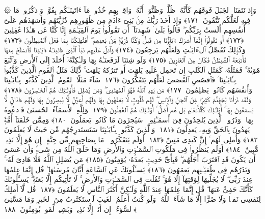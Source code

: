 ۞ وَإِذ نَتَقنَا ٱلجَبَلَ فَوقَهُم كَأَنَّهُۥ ظُلَّةٌۭ وَظَنُّوٓا۟ أَنَّهُۥ وَاقِعٌۢ بِهِم خُذُوا۟ مَآ ءَاتَينَـٰكُم بِقُوَّةٍۢ وَٱذكُرُوا۟ مَا فِيهِ لَعَلَّكُم تَتَّقُونَ ﴿١٧١﴾
 وَإِذ أَخَذَ رَبُّكَ مِنۢ بَنِىٓ ءَادَمَ مِن ظُهُورِهِم ذُرِّيَّتَهُم وَأَشهَدَهُم عَلَىٰٓ أَنفُسِهِم أَلَستُ بِرَبِّكُم ۖ قَالُوا۟ بَلَىٰ ۛ شَهِدنَآ ۛ أَن تَقُولُوا۟ يَومَ ٱلقِيَـٰمَةِ إِنَّا كُنَّا عَن هَـٰذَا غَٰفِلِينَ ﴿١٧٢﴾
 أَو تَقُولُوٓا۟ إِنَّمَآ أَشرَكَ ءَابَآؤُنَا مِن قَبلُ وَكُنَّا ذُرِّيَّةًۭ مِّنۢ بَعدِهِم ۖ أَفَتُهلِكُنَا بِمَا فَعَلَ ٱلمُبطِلُونَ ﴿١٧٣﴾
 وَكَذَٟلِكَ نُفَصِّلُ ٱلءَايَـٰتِ وَلَعَلَّهُم يَرجِعُونَ ﴿١٧٤﴾
 وَٱتلُ عَلَيهِم نَبَأَ ٱلَّذِىٓ ءَاتَينَـٰهُ ءَايَـٰتِنَا فَٱنسَلَخَ مِنهَا فَأَتبَعَهُ ٱلشَّيطَٰنُ فَكَانَ مِنَ ٱلغَاوِينَ ﴿١٧٥﴾
 وَلَو شِئنَا لَرَفَعنَـٰهُ بِهَا وَلَـٰكِنَّهُۥٓ أَخلَدَ إِلَى ٱلأَرضِ وَٱتَّبَعَ هَوَىٰهُ ۚ فَمَثَلُهُۥ كَمَثَلِ ٱلكَلبِ إِن تَحمِل عَلَيهِ يَلهَث أَو تَترُكهُ يَلهَث ۚ ذَّٰلِكَ مَثَلُ ٱلقَومِ ٱلَّذِينَ كَذَّبُوا۟ بِـَٔايَـٰتِنَا ۚ فَٱقصُصِ ٱلقَصَصَ لَعَلَّهُم يَتَفَكَّرُونَ ﴿١٧٦﴾
 سَآءَ مَثَلًا ٱلقَومُ ٱلَّذِينَ كَذَّبُوا۟ بِـَٔايَـٰتِنَا وَأَنفُسَهُم كَانُوا۟ يَظلِمُونَ ﴿١٧٧﴾
 مَن يَهدِ ٱللَّهُ فَهُوَ ٱلمُهتَدِى ۖ وَمَن يُضلِل فَأُو۟لَـٰٓئِكَ هُمُ ٱلخَـٰسِرُونَ ﴿١٧٨﴾
 وَلَقَد ذَرَأنَا لِجَهَنَّمَ كَثِيرًۭا مِّنَ ٱلجِنِّ وَٱلإِنسِ ۖ لَهُم قُلُوبٌۭ لَّا يَفقَهُونَ بِهَا وَلَهُم أَعيُنٌۭ لَّا يُبصِرُونَ بِهَا وَلَهُم ءَاذَانٌۭ لَّا يَسمَعُونَ بِهَآ ۚ أُو۟لَـٰٓئِكَ كَٱلأَنعَـٰمِ بَل هُم أَضَلُّ ۚ أُو۟لَـٰٓئِكَ هُمُ ٱلغَٰفِلُونَ ﴿١٧٩﴾
 وَلِلَّهِ ٱلأَسمَآءُ ٱلحُسنَىٰ فَٱدعُوهُ بِهَا ۖ وَذَرُوا۟ ٱلَّذِينَ يُلحِدُونَ فِىٓ أَسمَـٰٓئِهِۦ ۚ سَيُجزَونَ مَا كَانُوا۟ يَعمَلُونَ ﴿١٨٠﴾
 وَمِمَّن خَلَقنَآ أُمَّةٌۭ يَهدُونَ بِٱلحَقِّ وَبِهِۦ يَعدِلُونَ ﴿١٨١﴾
 وَٱلَّذِينَ كَذَّبُوا۟ بِـَٔايَـٰتِنَا سَنَستَدرِجُهُم مِّن حَيثُ لَا يَعلَمُونَ ﴿١٨٢﴾
 وَأُملِى لَهُم ۚ إِنَّ كَيدِى مَتِينٌ ﴿١٨٣﴾
 أَوَلَم يَتَفَكَّرُوا۟ ۗ مَا بِصَاحِبِهِم مِّن جِنَّةٍ ۚ إِن هُوَ إِلَّا نَذِيرٌۭ مُّبِينٌ ﴿١٨٤﴾
 أَوَلَم يَنظُرُوا۟ فِى مَلَكُوتِ ٱلسَّمَـٰوَٟتِ وَٱلأَرضِ وَمَا خَلَقَ ٱللَّهُ مِن شَىءٍۢ وَأَن عَسَىٰٓ أَن يَكُونَ قَدِ ٱقتَرَبَ أَجَلُهُم ۖ فَبِأَىِّ حَدِيثٍۭ بَعدَهُۥ يُؤمِنُونَ ﴿١٨٥﴾
 مَن يُضلِلِ ٱللَّهُ فَلَا هَادِىَ لَهُۥ ۚ وَيَذَرُهُم فِى طُغيَـٰنِهِم يَعمَهُونَ ﴿١٨٦﴾
 يَسـَٔلُونَكَ عَنِ ٱلسَّاعَةِ أَيَّانَ مُرسَىٰهَا ۖ قُل إِنَّمَا عِلمُهَا عِندَ رَبِّى ۖ لَا يُجَلِّيهَا لِوَقتِهَآ إِلَّا هُوَ ۚ ثَقُلَت فِى ٱلسَّمَـٰوَٟتِ وَٱلأَرضِ ۚ لَا تَأتِيكُم إِلَّا بَغتَةًۭ ۗ يَسـَٔلُونَكَ كَأَنَّكَ حَفِىٌّ عَنهَا ۖ قُل إِنَّمَا عِلمُهَا عِندَ ٱللَّهِ وَلَـٰكِنَّ أَكثَرَ ٱلنَّاسِ لَا يَعلَمُونَ ﴿١٨٧﴾
 قُل لَّآ أَملِكُ لِنَفسِى نَفعًۭا وَلَا ضَرًّا إِلَّا مَا شَآءَ ٱللَّهُ ۚ وَلَو كُنتُ أَعلَمُ ٱلغَيبَ لَٱستَكثَرتُ مِنَ ٱلخَيرِ وَمَا مَسَّنِىَ ٱلسُّوٓءُ ۚ إِن أَنَا۠ إِلَّا نَذِيرٌۭ وَبَشِيرٌۭ لِّقَومٍۢ يُؤمِنُونَ ﴿١٨٨﴾
